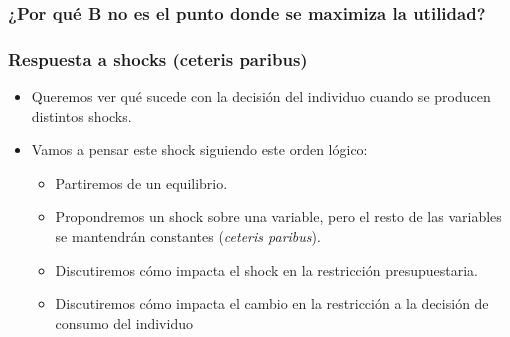 \documentclass{beamer}
\begin{document}
\begin{frame}
\frametitle{¿Por qué B no es el punto donde se maximiza la utilidad?}
\begin{center}
\end{center}
\end{frame}

\begin{frame}
\frametitle{Respuesta a shocks (ceteris paribus)}
\begin{itemize}
    \item Queremos ver qué sucede con la decisión del individuo cuando se producen distintos shocks. \vspace{2mm}
    \item Vamos a pensar este shock siguiendo este orden lógico:
    \begin{itemize}
        \item Partiremos de un equilibrio.
        \item Propondremos un shock sobre una variable, pero el resto de las variables se mantendrán constantes (\textit{ceteris paribus}).
        \item Discutiremos cómo impacta el shock en la restricción presupuestaria.      
        \item Discutiremos cómo impacta el cambio en la restricción a la decisión de consumo del individuo
    \end{itemize}
\end{itemize} 
\end{frame}
\end{document}
